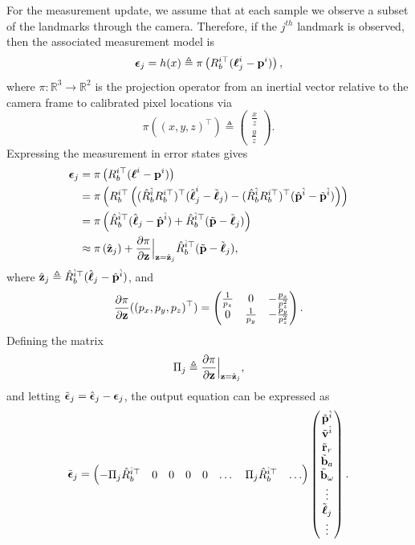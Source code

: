 For the measurement update, we assume that at each sample we observe a subset of the landmarks through the camera.  Therefore, if the $j^{th}$ landmark is observed, then the associated measurement model is
\[
\boldsymbol{\epsilon}_j = h(x) \triangleq \pi\left(R_b^{i\top} (\boldsymbol{\ell}_j^i - \mathbf{p}^i)\right),
\]
where $\pi:\mathbb{R}^3\to\mathbb{R}^2$ is the projection operator from an inertial vector relative to the camera frame to calibrated pixel locations via
\[
\pi((x, y, z)^\top) \triangleq \begin{pmatrix} \frac{x}{z} \\ \frac{y}{z} \end{pmatrix}.
\]
Expressing the measurement in error states gives
\begin{align*}
    \boldsymbol{\epsilon}_j &= \pi\left(R_b^{i\top} (\boldsymbol{\ell}^i - \mathbf{p}^i)\right) \\
      &= \pi\left(R_b^{i\top} \left( (\hat{R}_b^{\hat{i}} R_b^{i\top})^\top (\hat{\boldsymbol{\ell}}_j^i - \tilde{\boldsymbol{\ell}}_j) - (\hat{R}_b^{\hat{i}} R_b^{i\top})^\top (\hat{\mathbf{p}}^{\hat{i}} - \tilde{\mathbf{p}}^{\hat{i}})\right) \right) \\
      &= \pi\left(\hat{R}_b^{\hat{i}\top} (\hat{\boldsymbol{\ell}}_j - \hat{\mathbf{p}}^{\hat{i}}) + \hat{R}_b^{\hat{i}\top} (\tilde{\mathbf{p}}-\tilde{\boldsymbol{\ell}}_j) \right) \\
      &\approx \pi\left(\hat{\mathbf{z}}_j\right) + \frac{\partial\pi}{\partial \mathbf{z}}\Big|_{\mathbf{z}=\hat{\mathbf{z}}_j} \hat{R}_b^{\hat{i}\top} (\tilde{\mathbf{p}}-\tilde{\boldsymbol{\ell}}_j) ,
\end{align*}
where $\hat{\mathbf{z}}_j \triangleq \hat{R}_b^{\hat{i}\top} (\hat{\boldsymbol{\ell}}_j - \hat{\mathbf{p}}^{\hat{i}})$, and
\[
\frac{\partial\pi}{\partial\mathbf{z}}((p_x, p_y, p_z)^\top) = \begin{pmatrix} \frac{1}{p_z} & 0 & -\frac{p_x}{p_z^2} \\ 0 & \frac{1}{p_y} & -\frac{p_y}{p_z^2} \end{pmatrix}.
\]
Defining the matrix
\[
\Pi_j \triangleq \frac{\partial\pi}{\partial \mathbf{z}}\Big|_{\mathbf{z}=\hat{\mathbf{z}}_j},
\]
and letting $\tilde{\boldsymbol{\epsilon}}_j = \hat{\boldsymbol{\epsilon}}_j - \boldsymbol{\epsilon}_j$, 
the output equation can be expressed as
\[
\tilde{\boldsymbol{\epsilon}}_j 
    = \begin{pmatrix} 
    	-\Pi_j \hat{R}_b^{\hat{i}\top} & 0 & 0 & 0 & 0 & \dots & \Pi_j\hat{R}_b^{\hat{i}\top} & \dots 
      \end{pmatrix}
      \begin{pmatrix} 
      	\tilde{\mathbf{p}}^{\hat{i}} \\ 
      	\tilde{\mathbf{v}}^{\hat{i}} \\ 
      	\tilde{\mathbf{r}}_r \\ 
      	\tilde{\mathbf{b}}_a \\ 
      	\tilde{\mathbf{b}}_\omega \\ 
      	\vdots \\
      	\tilde{\boldsymbol{\ell}}_j \\ 
      	\vdots 
      \end{pmatrix}.
\]



